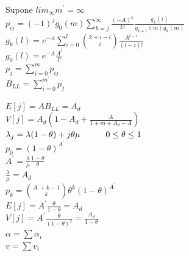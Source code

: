 \vfill\null
\columnbreak

\begin{minipage}{.22\textwidth}
	Supone $lim_\infty{m^{'}}=\infty$ \\
	$p_{ij}=(-1)^j{g_0(m)}\sum\limits_{k=j}^{\infty}\frac{(-A)^k}{k!}\frac{g_k(i)}{g_{k+1}(m)g_k(m)}$ \\
	$g_k(l)=e^{-A}\sum_{i=0}^l{\binom{k+i-l}{i}}\frac{A^{l-i}}{(l-i)!}$ \\
	$g_0(l)=e^{-A}\frac{A^l}{l!}$ \\
	$p_j=\sum_{i=0}^m{p_{ij}}$ \\
	$B_{LL}=\sum_{i=0}^{m^{'}}{p_{j}}$ \\
\end{minipage}

\begin{minipage}{.22\textwidth}
	$E[j]=AB_{LL}=A_d$ \\
	$V[j]=A_d(1-A_d+\frac{A}{1+m+A_d-A})$ \\
	$\lambda_j=\lambda(1-\theta)+j\theta\mu \hskip 3em 0\le{\theta}\le{1}$ \\
	$p_0=(1-\theta)^{A^{'}}$ \\
	$A^{'}=\frac{\lambda}{\mu}\frac{1-\theta}{\theta}$ \\
	$\frac{\lambda}{\mu}=A_d$ \\
	$p_k=\binom{A^{'}+k-1}{k}\theta^k(1-\theta)^{A^{'}}$\\
	$E[j]=A^{'}\frac{\theta}{1-\theta}=A_d$ \\
	$V[j]=A^{'}\frac{\theta}{(1-\theta)^2}=\frac{A_d}{1-\theta}$ \\
	$\alpha=\sum{\alpha_i}$ \\
	$v=\sum{v_i}$ \\
\end{minipage}

